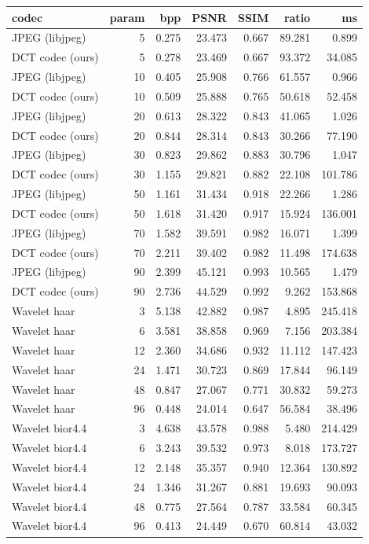 \begin{tabular}{lrrrrrr}
\toprule
codec & param & bpp & PSNR & SSIM & ratio & ms \\
\midrule
JPEG (libjpeg) & 5 & 0.275 & 23.473 & 0.667 & 89.281 & 0.899 \\
DCT codec (ours) & 5 & 0.278 & 23.469 & 0.667 & 93.372 & 34.085 \\
JPEG (libjpeg) & 10 & 0.405 & 25.908 & 0.766 & 61.557 & 0.966 \\
DCT codec (ours) & 10 & 0.509 & 25.888 & 0.765 & 50.618 & 52.458 \\
JPEG (libjpeg) & 20 & 0.613 & 28.322 & 0.843 & 41.065 & 1.026 \\
DCT codec (ours) & 20 & 0.844 & 28.314 & 0.843 & 30.266 & 77.190 \\
JPEG (libjpeg) & 30 & 0.823 & 29.862 & 0.883 & 30.796 & 1.047 \\
DCT codec (ours) & 30 & 1.155 & 29.821 & 0.882 & 22.108 & 101.786 \\
JPEG (libjpeg) & 50 & 1.161 & 31.434 & 0.918 & 22.266 & 1.286 \\
DCT codec (ours) & 50 & 1.618 & 31.420 & 0.917 & 15.924 & 136.001 \\
JPEG (libjpeg) & 70 & 1.582 & 39.591 & 0.982 & 16.071 & 1.399 \\
DCT codec (ours) & 70 & 2.211 & 39.402 & 0.982 & 11.498 & 174.638 \\
JPEG (libjpeg) & 90 & 2.399 & 45.121 & 0.993 & 10.565 & 1.479 \\
DCT codec (ours) & 90 & 2.736 & 44.529 & 0.992 & 9.262 & 153.868 \\
Wavelet haar & 3 & 5.138 & 42.882 & 0.987 & 4.895 & 245.418 \\
Wavelet haar & 6 & 3.581 & 38.858 & 0.969 & 7.156 & 203.384 \\
Wavelet haar & 12 & 2.360 & 34.686 & 0.932 & 11.112 & 147.423 \\
Wavelet haar & 24 & 1.471 & 30.723 & 0.869 & 17.844 & 96.149 \\
Wavelet haar & 48 & 0.847 & 27.067 & 0.771 & 30.832 & 59.273 \\
Wavelet haar & 96 & 0.448 & 24.014 & 0.647 & 56.584 & 38.496 \\
Wavelet bior4.4 & 3 & 4.638 & 43.578 & 0.988 & 5.480 & 214.429 \\
Wavelet bior4.4 & 6 & 3.243 & 39.532 & 0.973 & 8.018 & 173.727 \\
Wavelet bior4.4 & 12 & 2.148 & 35.357 & 0.940 & 12.364 & 130.892 \\
Wavelet bior4.4 & 24 & 1.346 & 31.267 & 0.881 & 19.693 & 90.093 \\
Wavelet bior4.4 & 48 & 0.775 & 27.564 & 0.787 & 33.584 & 60.345 \\
Wavelet bior4.4 & 96 & 0.413 & 24.449 & 0.670 & 60.814 & 43.032 \\
\bottomrule
\end{tabular}
